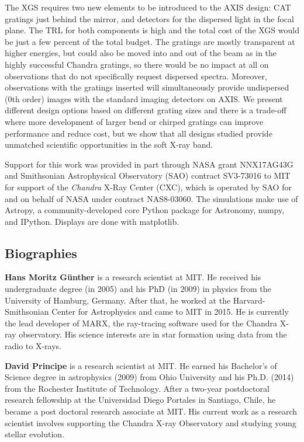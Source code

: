 \documentclass[12pt]{spieman}  %
\begin{document}
\begin{spacing}{1}
The XGS requires two new elements to be introduced to the AXIS design: CAT gratings just behind the mirror, and detectors for the dispersed light in the focal plane. The TRL for both components is high and the total cost of the XGS would be just a few percent of the total budget. The gratings are mostly transparent at higher energies, but could also be moved into and out of the beam as in the highly successful Chandra gratings, so there would be no impact at all on observations that do not specifically request dispersed spectra. Moreover, observations with the gratings inserted will simultaneously provide undispersed (0th order) images with the standard imaging detectors on AXIS. We present different design options based on different grating sizes and there is a trade-off where more development of larger bend or chirped gratings can improve performance and reduce cost, but we show that all designs studied provide unmatched scientific opportunities in the soft X-ray band.




\acknowledgments
Support for this work was provided in part through NASA grant NNX17AG43G and Smithsonian Astrophysical Observatory (SAO)
contract SV3-73016 to MIT for support of the {\em Chandra} X-Ray Center (CXC),
which is operated by SAO for and on behalf of NASA under contract NAS8-03060.
The simulations make use of Astropy, a community-developed core Python package
for Astronomy\cite{2013A&A...558A..33A,astropy}, numpy\cite{numpy}, and
IPython\cite{ipython}. Displays are done with matplotlib\cite{matplotlib}.


\subsection*{Biographies}
\vspace{2ex}\noindent\textbf{Hans Moritz G\"unther} is a research scientist at MIT. He received his undergraduate degree (in 2005) and his PhD (in 2009) in physics from the University of Hamburg, Germany. After that, he worked at the Harvard-Smithsonian Center for Astrophysics and came to MIT in 2015. He is currently the lead developer of MARX, the ray-tracing software used for the Chandra X-ray observatory. His science interests are in star formation using data from the radio to X-rays.


\vspace{2ex}\noindent\textbf{David Principe} is a research scientist at MIT. He earned his Bachelor's of Science degree in astrophysics (2009) from Ohio University and his Ph.D. (2014) from the Rochester Institute of Technology. After a two-year postdoctoral research fellowship at the Universidad Diego Portales in Santiago, Chile, he became a post doctoral research associate at MIT. His current work as a research scientist involves supporting the Chandra X-ray Observatory and studying young stellar evolution.



\end{spacing}
\end{document}
